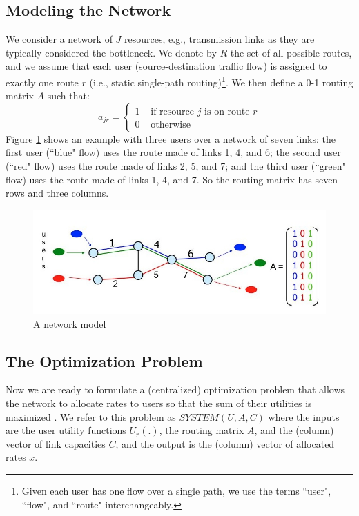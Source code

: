 \documentclass{article}
\begin{document}
\subsection{Modeling the Network}

We consider a network of $J$ resources, e.g., transmission links as they are typically considered the bottleneck. 
We denote by $R$ the set of all possible routes, and we assume that each user (source-destination traffic flow) is assigned to exactly one route $r$ (i.e., static single-path routing)\footnote{Given each user has one flow over a single path, we use the terms ``user", ``flow", and ``route" interchangeably.}.
We then define a 0-1 routing matrix $A$ such that:
$$
a_{jr} = \left\{ \begin{array}{rl} 
              1 & \mbox{ if resource $j$ is on route $r$} \\
              0 & \mbox{ otherwise}
              \end{array} \right.
$$
Figure \ref{fig:net-model} shows an example with three users  over a network of seven links: 
the first user (``blue" flow) uses the route made of links 1, 4, and 6;
the second user (``red" flow) uses the route made of links 2, 5, and 7;
and the third user (``green" flow) uses the route made of links 1, 4, and 7.
So the routing matrix has seven rows and three columns.

\begin{figure}[htbp] %
   \centering
   \includegraphics[width=5in]{figures/net-model.jpg} 
   \caption{A network model}
   \label{fig:net-model}
\end{figure}


\subsection{The Optimization Problem}

Now we are ready to formulate a (centralized) optimization problem that allows the network to allocate rates to users so that the sum of their utilities is maximized \cite{Kelly-2001}. We refer to this problem as $SYSTEM(U, A, C)$ where the inputs are the user utility functions $U_r(.)$, the routing matrix $A$, and the (column) vector of link capacities $C$, and the output is the (column) vector of allocated rates $x$. \\
\end{document}
